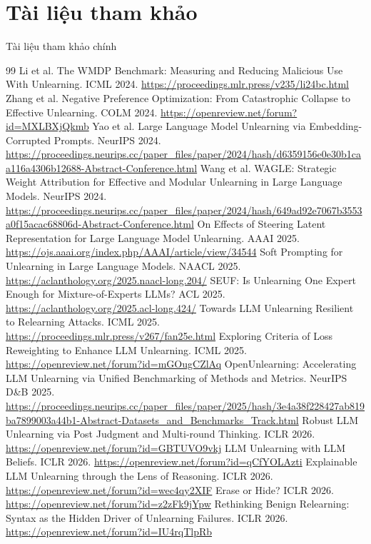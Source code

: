 \documentclass[t, aspectratio=169]{beamer}
\begin{document}
\section*{Tài liệu tham khảo}

\begin{frame}[allowframebreaks]{Tài liệu tham khảo chính}
  \scriptsize
  \begin{thebibliography}{99}
     Li et al. The WMDP Benchmark: Measuring and Reducing Malicious Use With Unlearning. ICML 2024. \url{https://proceedings.mlr.press/v235/li24bc.html}
     Zhang et al. Negative Preference Optimization: From Catastrophic Collapse to Effective Unlearning. COLM 2024. \url{https://openreview.net/forum?id=MXLBXjQkmb}
     Yao et al. Large Language Model Unlearning via Embedding-Corrupted Prompts. NeurIPS 2024. \url{https://proceedings.neurips.cc/paper_files/paper/2024/hash/d6359156e0e30b1caa116a4306b12688-Abstract-Conference.html}
     Wang et al. WAGLE: Strategic Weight Attribution for Effective and Modular Unlearning in Large Language Models. NeurIPS 2024. \url{https://proceedings.neurips.cc/paper_files/paper/2024/hash/649ad92e7067b3553a0f15acac68806d-Abstract-Conference.html}
     On Effects of Steering Latent Representation for Large Language Model Unlearning. AAAI 2025. \url{https://ojs.aaai.org/index.php/AAAI/article/view/34544}
     Soft Prompting for Unlearning in Large Language Models. NAACL 2025. \url{https://aclanthology.org/2025.naacl-long.204/}
     SEUF: Is Unlearning One Expert Enough for Mixture-of-Experts LLMs? ACL 2025. \url{https://aclanthology.org/2025.acl-long.424/}
     Towards LLM Unlearning Resilient to Relearning Attacks. ICML 2025. \url{https://proceedings.mlr.press/v267/fan25e.html}
     Exploring Criteria of Loss Reweighting to Enhance LLM Unlearning. ICML 2025. \url{https://openreview.net/forum?id=mGOugCZlAq}
     OpenUnlearning: Accelerating LLM Unlearning via Unified Benchmarking of Methods and Metrics. NeurIPS D\&B 2025. \url{https://proceedings.neurips.cc/paper_files/paper/2025/hash/3e4a38f228427ab819ba7899003a44b1-Abstract-Datasets_and_Benchmarks_Track.html}
     Robust LLM Unlearning via Post Judgment and Multi-round Thinking. ICLR 2026. \url{https://openreview.net/forum?id=GBTUVO9vkj}
     LLM Unlearning with LLM Beliefs. ICLR 2026. \url{https://openreview.net/forum?id=qCfYOLAzti}
     Explainable LLM Unlearning through the Lens of Reasoning. ICLR 2026. \url{https://openreview.net/forum?id=wec4qy2XIF}
     Erase or Hide? ICLR 2026. \url{https://openreview.net/forum?id=z2zFk9jYpw}
     Rethinking Benign Relearning: Syntax as the Hidden Driver of Unlearning Failures. ICLR 2026. \url{https://openreview.net/forum?id=IU4rqTlpRb}
  \end{thebibliography}
\end{frame}

\hustthankyou
\end{document}
